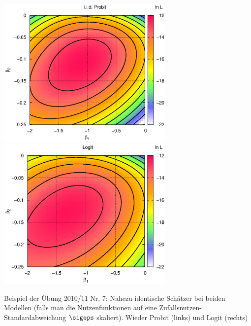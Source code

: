 \documentclass[a4paper]{foils}
\begin{document}
\begin{landscape}
\begin{center}
 \includegraphics[width=0.65\textwidth]{./figsDiscr/kalProbitBinom_beta1beta2.eps}
 \includegraphics[width=0.65\textwidth]{./figsDiscr/kalLogitBinom_beta1beta2.eps}   
\vspace{1em}

\parbox{1.1\textwidth}{Beispiel der \"Ubung 2010/11 Nr. 7:
Nahezu identische Sch\"atzer bei beiden Modellen (falls
  man die Nutzenfunktionen auf eine  Zufallsnutzen-Standardabweichung
  $\sigeps$ skaliert). Wieder  Probit (links) und Logit (rechts)}

\newpage

\vspace{1em}


\end{center}
\end{landscape}
\end{document}
